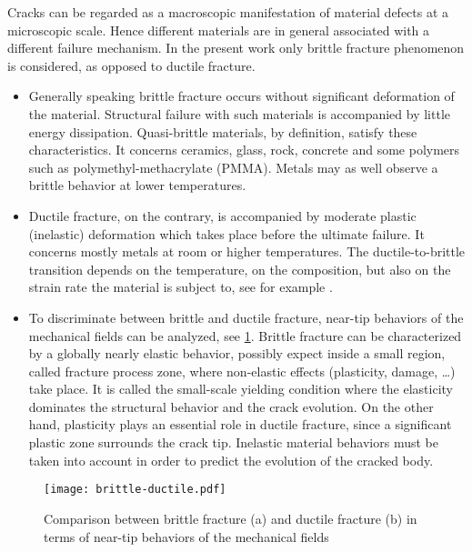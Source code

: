 Cracks can be regarded as a macroscopic manifestation of material defects at a microscopic scale. Hence different materials are in general associated with a different failure mechanism. In the present work only brittle fracture phenomenon is considered, as opposed to ductile fracture.
\begin{itemize}
\item Generally speaking brittle fracture occurs without significant deformation of the material. Structural failure with such materials is accompanied by little energy dissipation. Quasi-brittle materials, by definition, satisfy these characteristics. It concerns ceramics, glass, rock, concrete and some polymers such as polymethyl-methacrylate (PMMA). Metals may as well observe a brittle behavior at lower temperatures.

\item Ductile fracture, on the contrary, is accompanied by moderate plastic (inelastic) deformation which takes place before the ultimate failure. It concerns mostly metals at room or higher temperatures. The ductile-to-brittle transition depends on the temperature, on the composition, but also on the strain rate the material is subject to, see for example \cite{Kalthoff:2000}.

\item To discriminate between brittle and ductile fracture, near-tip behaviors of the mechanical fields can be analyzed, see \cref{fig:brittleductile}. Brittle fracture can be characterized by a globally nearly elastic behavior, possibly expect inside a small region, called fracture process zone, where non-elastic effects (plasticity, damage, \ldots) take place. It is called the small-scale yielding condition where the elasticity dominates the structural behavior and the crack evolution. On the other hand, plasticity plays an essential role in ductile fracture, since a significant plastic zone surrounds the crack tip. Inelastic material behaviors must be taken into account in order to predict the evolution of the cracked body.
\end{itemize}
\begin{figure}[htbp]
\centering
\texttt{[image: brittle-ductile.pdf]}
\caption{Comparison between brittle fracture (a) and ductile fracture (b) in terms of near-tip behaviors of the mechanical fields} \label{fig:brittleductile}
\end{figure}

